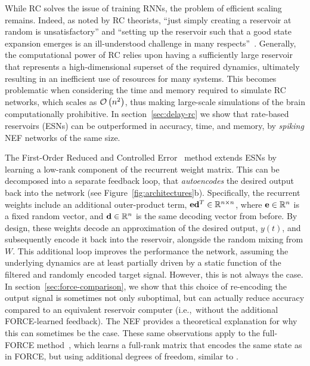 While RC solves the issue of training RNNs, the problem of efficient scaling remains. 
Indeed, as noted by RC theorists, ``just simply creating a reservoir at random is unsatisfactory'' and ``setting up the reservoir such that a good state expansion emerges is an ill-understood challenge in many respects''~\citep{lukovsevicius2012reservoir}.
Generally, the computational power of RC relies upon having a sufficiently large reservoir that represents a high-dimensional superset of the required dynamics, ultimately resulting in an inefficient use of resources for many systems.
This becomes problematic when considering the time and memory required to simulate RC networks, which scales as $\mathcal{O}\left({ n^2 }\right)$, thus making large-scale simulations of the brain computationally prohibitive.
In section~\ref{sec:delay-rc} we show that rate-based reservoirs (ESNs) can be outperformed in accuracy, time, and memory, by \emph{spiking} NEF networks of the same size.

The First-Order Reduced and Controlled Error~\citep[FORCE;][]{sussillo2009generating} method extends ESNs by learning a low-rank component of the recurrent weight matrix.
This can be decomposed into a separate feedback loop, that \emph{autoencodes} the desired output back into the network (see Figure~\ref{fig:architectures}b).
Specifically, the recurrent weights include an additional outer-product term, $\mathbf{e} \mathbf{d}^T \in \mathbb{R}^{n \times n}$, where $\mathbf{e} \in \mathbb{R}^n$ is a fixed random vector, and $\mathbf{d} \in \mathbb{R}^n$ is the same decoding vector from before.
By design, these weights decode an approximation of the desired output, $y(t)$, and subsequently encode it back into the reservoir, alongside the random mixing from $W$.
This additional loop improves the performance the network, assuming the underlying dynamics are at least partially driven by a static function of the filtered and randomly encoded target signal.
However, this is not always the case.
In section~\ref{sec:force-comparison}, we show that this choice of re-encoding the output signal is sometimes not only suboptimal, but can actually reduce accuracy compared to an equivalent reservoir computer (i.e.,~without the additional FORCE-learned feedback).
The NEF provides a theoretical explanation for why this can sometimes be the case.
These same observations apply to the full-FORCE method~\citep{depasquale2018full}, which learns a full-rank matrix that encodes the same state as in FORCE, but using additional degrees of freedom, similar to \citet{tripp2006neural}.

